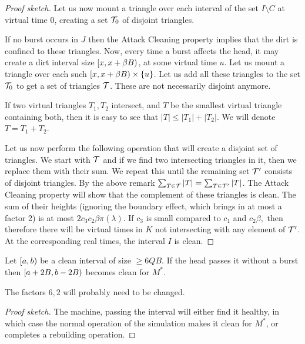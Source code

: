 \documentclass[12pt]{memoir}
\renewcommand{\le}{\leq}
\renewcommand{\ge}{\geq}
\def\B{B}
\newcommand{\Q}{Q}
\begin{document}
\begin{proof}[Proof sketch]
Let us now mount a triangle over each interval of the set \( I\setminus C \)
at virtual time 0, creating a set \( \mathcal{T}_{0} \) of disjoint triangles.

If no burst occurs in \( J \) 
then the Attack Cleaning property implies that the dirt is confined to these triangles.
Now, every time a burst affects the head, it may create a dirt interval 
size \( \lint{x}{x+\beta\B} \), at some virtual time \( u \).
Let us mount a triangle over each such \( \lint{x}{x+\beta\B}\times\{u\} \).
Let us add all these triangles to the set \( \mathcal{T}_{0} \) to get a set of
triangles \( \mathcal{T} \).
These are not necessarily disjoint anymore.

If two virtual triangles \( T_{1},T_{2} \) intersect,
and \( T \) be the smallest virtual triangle containing both,
then it is easy to see that \( |T|\le|T_{1}|+|T_{2}| \).
We will denote \( T=T_{1}+T_{2} \).

Let us now perform the following operation that will create a disjoint set
of triangles.
We start with \( \mathcal{T} \) and if we find two intersecting triangles 
in it, then we replace them with their sum.
We repeat this until the remaining set \( \mathcal{T}' \) consists of disjoint triangles.
By the above remark \( \sum_{T\in \mathcal{T}}|T| = \sum_{T\in \mathcal{T}'}|T| \).
The Attack Cleaning property will show that the complement of these triangles
is clean.
The sum of their heights (ignoring the boundary effect, which brings in at most a factor 2) is
at most \( 2 c_{3}c_{2}\beta\pi(\lambda) \).
If \( c_{3} \) is small compared to \( c_{1}  \) and \( c_{2}\beta, \) 
then therefore there will be virtual
times in \( K \) not intersecting with any element of \( \mathcal{T}' \).
At the corresponding real times, the interval \( I \) is clean.
\end{proof}

\begin{lemma}\label{lem:rebuild-pass}
  Let \( \left[a,b\right) \) be a clean interval of size \( \ge 6 \Q\B \).
If the head passes it without a burst then \( \lint{a+2\B}{b-2\B} \)
becomes clean for \( M^{*} \).
\end{lemma}
The factors \( 6,2 \) will probably need to be changed.
\begin{proof}[Proof sketch]
  The machine, passing the interval will either find it healthy, in which case
the normal operation of the simulation makes it clean for \( M^{*} \),
or completes a rebuilding operation.
\end{proof}
\end{document}
